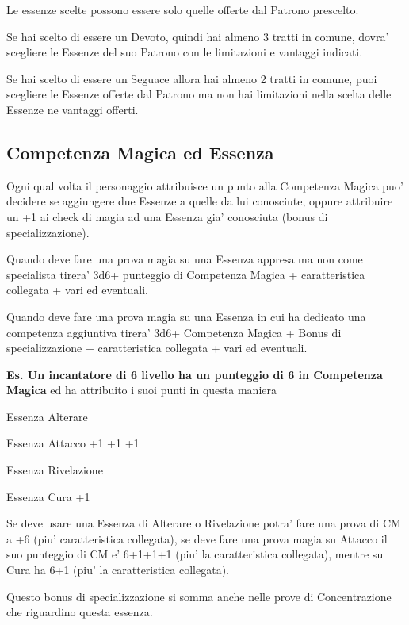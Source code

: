 \documentclass[a4paper,11pt,twoside,openany]{dndbook}
\begin{document}
Le essenze scelte possono essere solo quelle offerte dal Patrono prescelto.

Se hai scelto di essere un Devoto, quindi hai almeno 3 tratti in comune, dovra' scegliere le Essenze del suo Patrono con le limitazioni e vantaggi indicati.

Se hai scelto di essere un Seguace allora hai almeno 2 tratti in comune, puoi scegliere le Essenze offerte dal Patrono ma non hai limitazioni nella scelta delle Essenze ne vantaggi offerti.

\subsection{Competenza Magica ed Essenza}

\label{competenza-magica-ed-essenza}

Ogni qual volta il personaggio attribuisce un punto alla Competenza Magica puo' decidere se aggiungere due Essenze a quelle da lui conosciute, oppure attribuire un +1 ai check di magia ad una Essenza gia' conosciuta (bonus di specializzazione).

Quando deve fare una prova magia su una Essenza appresa ma non come specialista tirera' 3d6+ punteggio di Competenza Magica + caratteristica collegata + vari ed eventuali.

Quando deve fare una prova magia su una Essenza in cui ha dedicato una competenza aggiuntiva tirera' 3d6+ Competenza Magica + Bonus di specializzazione + caratteristica collegata + vari ed eventuali.

\bigskip

\textbf{Es. Un incantatore di 6 livello ha un punteggio di 6 in Competenza Magica} ed ha attribuito i suoi punti in questa maniera

Essenza Alterare

Essenza Attacco +1 +1 +1

Essenza Rivelazione

Essenza Cura +1

Se deve usare una Essenza di Alterare o Rivelazione potra' fare una prova di CM a +6 (piu' caratteristica collegata), se deve fare una prova magia su Attacco il suo punteggio di CM e' 6+1+1+1 (piu' la caratteristica collegata), mentre su Cura ha 6+1 (piu' la caratteristica collegata).

Questo bonus di specializzazione si somma anche nelle prove di Concentrazione che riguardino questa essenza.
\end{document}
